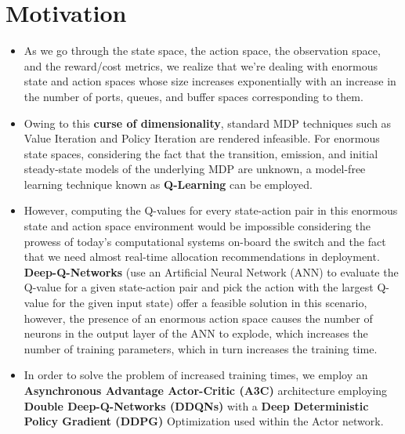 \documentclass{article}
\begin{document}
\section{Motivation}
\begin{itemize}
    \item As we go through the state space, the action space, the observation space, and the reward/cost metrics, we realize that we're dealing with enormous state and action spaces whose size increases exponentially with an increase in the number of ports, queues, and buffer spaces corresponding to them.
    \item Owing to this \textbf{curse of dimensionality}, standard MDP techniques such as Value Iteration and Policy Iteration are rendered infeasible. For enormous state spaces, considering the fact that the transition, emission, and initial steady-state models of the underlying MDP are unknown, a model-free learning technique known as \textbf{Q-Learning} can be employed.
    \item However, computing the Q-values for every state-action pair in this enormous state and action space environment would be impossible considering the prowess of today's computational systems on-board the switch and the fact that we need almost real-time allocation recommendations in deployment. \textbf{Deep-Q-Networks} (use an Artificial Neural Network (ANN) to evaluate the Q-value for a given state-action pair and pick the action with the largest Q-value for the given input state) offer a feasible solution in this scenario, however, the presence of an enormous action space causes the number of neurons in the output layer of the ANN to explode, which increases the number of training parameters, which in turn increases the training time.
    \item In order to solve the problem of increased training times, we employ an \textbf{Asynchronous Advantage Actor-Critic (A3C)} architecture employing \textbf{Double Deep-Q-Networks (DDQNs)} with a \textbf{Deep Deterministic Policy Gradient (DDPG)} Optimization used within the Actor network.
\end{itemize}
\end{document}
